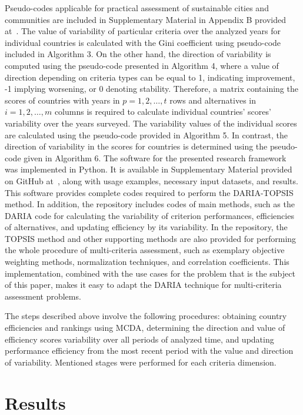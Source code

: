 \documentclass[final,5p,times,twocolumn,authoryear]{elsarticle}
\newcounter{example}[section]
\begin{document}
Pseudo-codes applicable for practical assessment of sustainable cities and communities are included in Supplementary Material in Appendix B provided at~\citep{dariagithub2022}.
The value of variability of particular criteria over the analyzed years for individual countries is calculated with the Gini coefficient using pseudo-code included in Algorithm 3. On the other hand, the direction of variability is computed using the pseudo-code presented in Algorithm 4, where a value of direction depending on criteria types can be equal to 1, indicating improvement, -1 implying worsening, or 0 denoting stability. Therefore, a matrix containing the scores of countries with years in $p = 1, 2, \ldots, t$ rows and alternatives in $i = 1, 2, \ldots, m$ columns is required to calculate individual countries' scores' variability over the years surveyed. The variability values of the individual scores are calculated using the pseudo-code provided in Algorithm 5. In contrast, the direction of variability in the scores for countries is determined using the pseudo-code given in Algorithm 6. The software for the presented research framework was implemented in Python. It is available in Supplementary Material provided on GitHub at~\citep{dariagithub2022}, along with usage examples, necessary input datasets, and results. This software provides complete codes required to perform the DARIA-TOPSIS method. In addition, the repository includes codes of main methods, such as the DARIA code for calculating the variability of criterion performances, efficiencies of alternatives, and updating efficiency by its variability. In the repository, the TOPSIS method and other supporting methods are also provided for performing the whole procedure of multi-criteria assessment, such as exemplary objective weighting methods, normalization techniques, and correlation coefficients. This implementation, combined with the use cases for the problem that is the subject of this paper, makes it easy to adapt the DARIA technique for multi-criteria assessment problems.

The steps described above involve the following procedures: obtaining country efficiencies and rankings using MCDA, determining the direction and value of efficiency scores variability over all periods of analyzed time, and updating performance efficiency from the most recent period with the value and direction of variability. Mentioned stages were performed for each criteria dimension.

\section{Results}
\label{sec:results}
\end{document}
